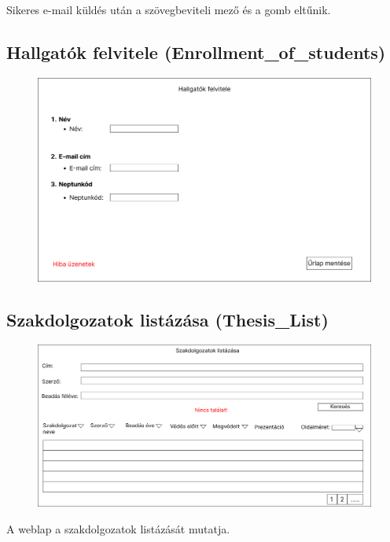 \documentclass[a4paper,12pt]{article}
\begin{document}
Sikeres e-mail küldés után a szövegbeviteli mező és a gomb eltűnik.

\subsection{Hallgatók felvitele (Enrollment\_of\_students)}

\begin{figure}
	\centering
	\includegraphics[width=\textwidth]{images/Web_pages/Enrollment_of_students.png}
	\caption{}
	\label{fig:Enrollment_of_students}
\end{figure}

\subsection{Szakdolgozatok listázása (Thesis\_List)}

\begin{figure}
	\centering
	\includegraphics[width=\textwidth]{images/Web_pages/Thesis_List.jpg}
	\caption{}
	\label{fig:Thesis_List}
\end{figure}

A weblap a szakdolgozatok listázását mutatja.
\end{document}
